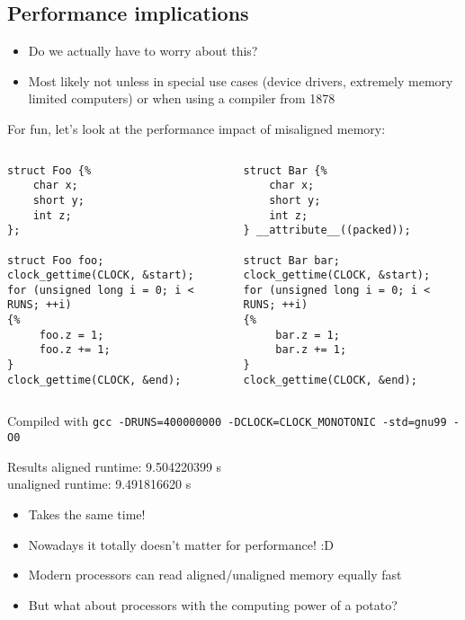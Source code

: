 \documentclass{beamer}
\begin{document}
\subsection{Performance implications}
\begin{frame}{\insertsection}{\insertsubsection}
	\begin{itemize}
        \item Do we actually have to worry about this?\pause
        \item Most likely not unless in special use cases (device drivers, extremely memory
            limited computers) or when using a compiler from 1878
	\end{itemize}
\end{frame}

\begin{frame}[fragile]{\insertsection}{\insertsubsection}
    For fun, let's look at the performance impact of misaligned memory:
    \begin{columns}[t]
            \begin{verbatim}
struct Foo {%
    char x;
    short y;
    int z;
};

struct Foo foo;
clock_gettime(CLOCK, &start);
for (unsigned long i = 0; i < RUNS; ++i)
{%
     foo.z = 1;
     foo.z += 1;
}
clock_gettime(CLOCK, &end);
            \end{verbatim}

            \begin{verbatim}
struct Bar {%
    char x;
    short y;
    int z;
} __attribute__((packed));

struct Bar bar;
clock_gettime(CLOCK, &start);
for (unsigned long i = 0; i < RUNS; ++i)
{%
     bar.z = 1;
     bar.z += 1;
}
clock_gettime(CLOCK, &end);
            \end{verbatim}
    \end{columns}
    Compiled with \small\verb|gcc -DRUNS=400000000 -DCLOCK=CLOCK_MONOTONIC -std=gnu99 -O0|
\end{frame}

\begin{frame}{\insertsection}{\insertsubsection}
    \begin{block}{Results}
        aligned runtime: 9.504220399 s\\
        unaligned runtime: 9.491816620 s
    \end{block}
    \pause
    \begin{itemize}
        \item Takes the same time!
	    \item Nowadays it totally doesn't matter for performance! :D
        \item Modern processors can read aligned/unaligned memory equally fast\pause
        \item But what about processors with the computing power of a potato?
	\end{itemize}
\end{frame}
\end{document}
